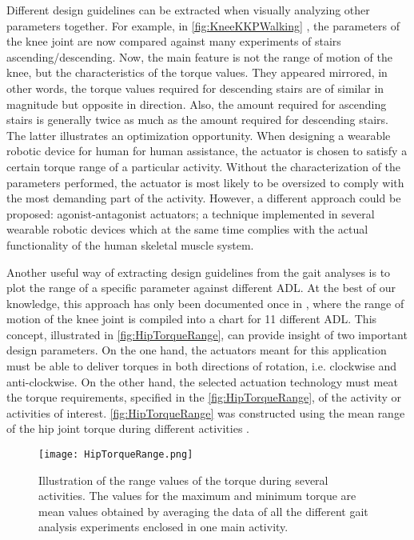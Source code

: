 Different design guidelines can be extracted when visually analyzing other parameters together. For example, in \autoref{fig:KneeKKPWalking} , the parameters of the knee joint are now compared against many experiments of stairs ascending/descending. Now, the main feature is not the range of motion of the knee, but the characteristics of the torque values. They appeared mirrored, in other words, the torque values required for descending stairs are of similar in magnitude but opposite in direction. Also, the amount required for ascending stairs is generally twice as much as the amount required for descending stairs. The latter illustrates an optimization opportunity. When designing a wearable robotic device for human for human assistance, the actuator is chosen to satisfy a certain torque range of a particular activity. Without the characterization of the parameters performed, the actuator is most likely to be oversized to comply with the most demanding part of the activity. However, a different approach could be proposed: agonist-antagonist actuators; a technique implemented in several wearable robotic devices which at the same time complies with the actual functionality of the human skeletal muscle system.

Another useful way of extracting design guidelines from the gait analyses is to plot the range of a specific parameter against different ADL. At the best of our knowledge, this approach has only been documented once in \cite{rowe2000knee}, where the range of motion of the knee joint is compiled into a chart for 11 different ADL. This concept, illustrated in \autoref{fig:HipTorqueRange}, can provide insight of two important design parameters. On the one hand, the actuators meant for this application must be able to deliver torques in both directions of rotation, i.e. clockwise and anti-clockwise. On the other hand, the selected actuation technology must meat the torque requirements, specified in the \autoref{fig:HipTorqueRange}, of the activity or activities of interest. \autoref{fig:HipTorqueRange} was constructed using the mean range of the hip joint torque during different activities \cite{bovi2011multiple,lee2008biomechanics,han2011biomechanical,protopapadaki2007hip,riener2002stair,mcintosh2006gait,roebroeck1994biomechanics,mak2003joint}.

\begin{figure}[htbp!]
    \centering
    \texttt{[image: HipTorqueRange.png]}
    \caption{Illustration of the range values of the torque during several activities. The values for the maximum and minimum torque are mean values obtained by averaging the data of all the different gait analysis experiments enclosed in one main activity. \cite{bovi2011multiple,lee2008biomechanics,han2011biomechanical,protopapadaki2007hip,riener2002stair,mcintosh2006gait,roebroeck1994biomechanics,mak2003joint} }
    \label{fig:HipTorqueRange}
\end{figure}

